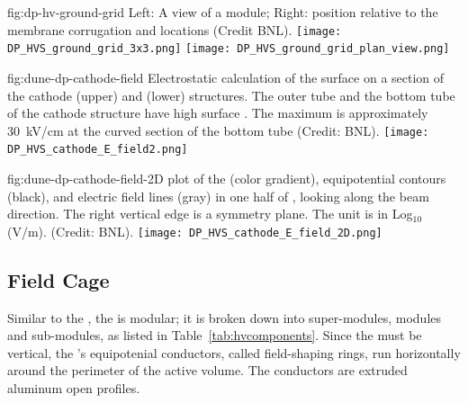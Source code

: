\begin{dunefigure}{fig:dp-hv-ground-grid}
{Left: A view of a  module; Right:  position relative to the membrane corrugation and  locations (Credit BNL).}
\texttt{[image: DP\_HVS\_ground\_grid\_3x3.png]}
\texttt{[image: DP\_HVS\_ground\_grid\_plan\_view.png]}
\end{dunefigure}


\begin{dunefigure}{fig:dune-dp-cathode-field}
{Electrostatic calculation of the surface \efield on a section of the cathode (upper) and  (lower) structures. The outer tube and the bottom tube of the cathode structure have high surface \efield. The maximum \efield is approximately \SI{30}{\kV/\cm} at the curved section of the bottom tube (Credit: BNL).} 
\texttt{[image: DP\_HVS\_cathode\_E\_field2.png]}
\end{dunefigure}

\begin{dunefigure}{fig:dune-dp-cathode-field-2D}
{\twod plot of the \efield (color gradient), equipotential contours (black), and electric field lines (gray) in one half of , looking along the beam direction. The right vertical edge is a symmetry plane. The \efield unit is in Log$_{10}\,$(V/m).  (Credit: BNL).} 
\texttt{[image: DP\_HVS\_cathode\_E\_field\_2D.png]}
\end{dunefigure}


\subsection{Field Cage}
\label{sec:dp-hv-system-fc}


Similar to the  , the   is modular; it is broken down into super-modules, modules and sub-modules, as listed in Table~\ref{tab:hvcomponents}.  
Since the \efield must be vertical, the 's equipotenial conductors, called field-shaping rings, run horizontally around the perimeter of the active volume. The conductors are extruded aluminum open profiles. %

